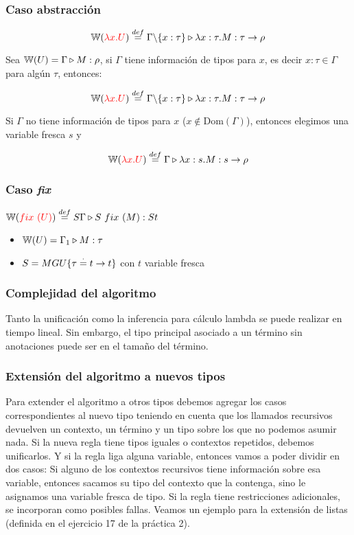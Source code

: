 \subsubsection{Caso abstracción}
$$\mathbb{W}({\color{red}\lambda x. U}) \overset{def}{=} \Gamma \backslash\{x:\tau\}\triangleright \lambda x: \tau . M : \tau\to\rho$$


Sea $\mathbb{W}(U) = \Gamma\triangleright M : \rho$, si $\Gamma$ tiene información de tipos para $x$, es decir $x:\tau\in\Gamma$ para algún $\tau$, entonces:

$$\mathbb{W}({\color{red}\lambda x. U}) \overset{def}{=} \Gamma \backslash\{x:\tau\}\triangleright \lambda x: \tau . M : \tau\to\rho$$

Si $\Gamma$ no tiene información de tipos para $x$ ($x\notin \text{Dom}(\Gamma)$), entonces elegimos una variable fresca $s$ y

$$\mathbb{W}({\color{red}\lambda x. U}) \overset{def}{=} \Gamma\triangleright \lambda x: s . M : s\to\rho$$

\subsubsection{Caso \textit{fix}}
$\mathbb{W}({\color{red}fix~(U)}) \overset{def}{=} S\Gamma\triangleright S~fix~(M) : St$
\begin{centrado}
\begin{itemize}
\item $\mathbb{W}(U) = \Gamma_1\triangleright M : \tau$
\item $S = MGU\{\tau\overset{\cdot}{=} t\to t\}$ con $t$ variable fresca
\end{itemize}
\end{centrado}

\subsubsection{Complejidad del algoritmo}
Tanto la unificación como la inferencia para cálculo lambda se puede realizar en tiempo lineal. Sin embargo, el tipo principal asociado a un término sin anotaciones puede ser  en el tamaño del término.

\subsubsection{Extensión del algoritmo a nuevos tipos}
Para extender el algoritmo a otros tipos debemos agregar los casos correspondientes al nuevo tipo teniendo en cuenta que los llamados recursivos devuelven un contexto, un término y un tipo sobre los que no podemos asumir nada.
Si la nueva regla tiene tipos iguales o contextos repetidos, debemos unificarlos. Y si la regla liga alguna variable, entonces vamos a poder dividir en dos casos: 
Si alguno de los contextos recursivos tiene información sobre esa variable, entonces sacamos su tipo del contexto que la contenga, sino le asignamos una variable fresca de tipo. Si la regla tiene restricciones adicionales, se incorporan como posibles fallas. Veamos un ejemplo para la extensión de listas (definida en el ejercicio 17 de la práctica 2).

